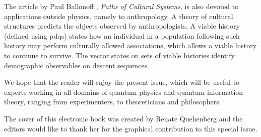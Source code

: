 \documentclass[entropy,editorial,accept,moreauthors,pdftex,10pt,a4paper]{Definitions/mdpi}
\begin{document}
The article by Paul Ballonoff \cite{A13}, {\it  Paths of Cultural Systems},  is also devoted to applications outside physics, namely to anthropology.
A theory of cultural structures predicts the objects observed by anthropologists. A viable history (defined using pdqs) states how an individual
in a population following such history may perform culturally allowed associations, which allows a viable history to continue to survive.
The vector states on sets of viable histories identify demographic observables on descent sequences.


We hope that the reader will enjoy the present issue, which will be useful to experts working in all
domains of quantum physics and quantum information theory, ranging from experimenters, to
theoreticians and philosophers.

The cover of this electronic book was created by Renate Quehenberg and the editors would like to thank her
for the graphical contribution to this special issue.

\vspace{6pt}


%
%
\end{document}
